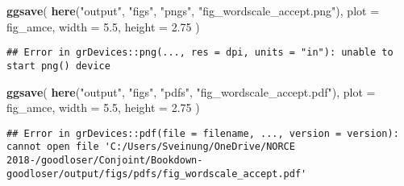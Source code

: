 \documentclass[]{book}
\newenvironment{Shaded}{\begin{snugshade}}{\end{snugshade}}
\newcommand{\KeywordTok}[1]{\textcolor[rgb]{0.13,0.29,0.53}{\textbf{#1}}}
\newcommand{\DataTypeTok}[1]{\textcolor[rgb]{0.13,0.29,0.53}{#1}}
\newcommand{\FloatTok}[1]{\textcolor[rgb]{0.00,0.00,0.81}{#1}}
\newcommand{\StringTok}[1]{\textcolor[rgb]{0.31,0.60,0.02}{#1}}
\newcommand{\NormalTok}[1]{#1}
\begin{document}
\begin{Shaded}
\begin{Highlighting}[]
\KeywordTok{ggsave}\NormalTok{(}
  \KeywordTok{here}\NormalTok{(}\StringTok{"output"}\NormalTok{, }\StringTok{"figs"}\NormalTok{, }\StringTok{"pngs"}\NormalTok{, }\StringTok{"fig_wordscale_accept.png"}\NormalTok{),}
  \DataTypeTok{plot =}\NormalTok{ fig_amce,}
  \DataTypeTok{width =} \FloatTok{5.5}\NormalTok{, }\DataTypeTok{height =} \FloatTok{2.75}
\NormalTok{)}
\end{Highlighting}
\end{Shaded}

\begin{verbatim}
## Error in grDevices::png(..., res = dpi, units = "in"): unable to start png() device
\end{verbatim}

\begin{Shaded}
\begin{Highlighting}[]
\KeywordTok{ggsave}\NormalTok{(}
  \KeywordTok{here}\NormalTok{(}\StringTok{"output"}\NormalTok{, }\StringTok{"figs"}\NormalTok{, }\StringTok{"pdfs"}\NormalTok{, }\StringTok{"fig_wordscale_accept.pdf"}\NormalTok{),}
  \DataTypeTok{plot =}\NormalTok{ fig_amce,}
  \DataTypeTok{width =} \FloatTok{5.5}\NormalTok{, }\DataTypeTok{height =} \FloatTok{2.75}
\NormalTok{)}
\end{Highlighting}
\end{Shaded}

\begin{verbatim}
## Error in grDevices::pdf(file = filename, ..., version = version): cannot open file 'C:/Users/Sveinung/OneDrive/NORCE 2018-/goodloser/Conjoint/Bookdown-goodloser/output/figs/pdfs/fig_wordscale_accept.pdf'
\end{verbatim}
\end{document}
